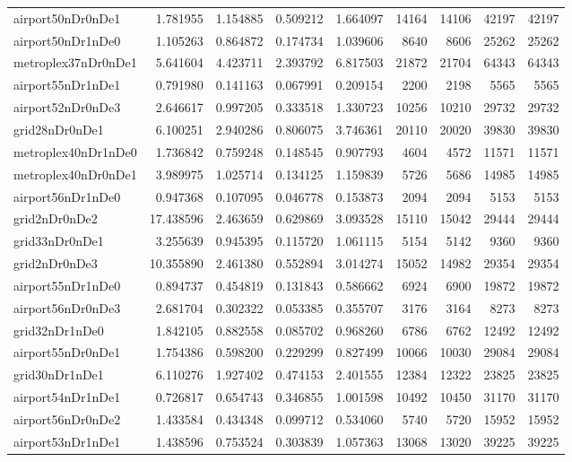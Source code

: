 \begin{longtable}{|l|r|r|r|r|r|r|r|r|}
airport50nDr0nDe1 & 1.781955 & 1.154885 & 0.509212 & 1.664097 & 14164 & 14106 & 42197 & 42197 \\
airport50nDr1nDe0 & 1.105263 & 0.864872 & 0.174734 & 1.039606 & 8640 & 8606 & 25262 & 25262 \\
metroplex37nDr0nDe1 & 5.641604 & 4.423711 & 2.393792 & 6.817503 & 21872 & 21704 & 64343 & 64343 \\
airport55nDr1nDe1 & 0.791980 & 0.141163 & 0.067991 & 0.209154 & 2200 & 2198 & 5565 & 5565 \\
airport52nDr0nDe3 & 2.646617 & 0.997205 & 0.333518 & 1.330723 & 10256 & 10210 & 29732 & 29732 \\
grid28nDr0nDe1 & 6.100251 & 2.940286 & 0.806075 & 3.746361 & 20110 & 20020 & 39830 & 39830 \\
metroplex40nDr1nDe0 & 1.736842 & 0.759248 & 0.148545 & 0.907793 & 4604 & 4572 & 11571 & 11571 \\
metroplex40nDr0nDe1 & 3.989975 & 1.025714 & 0.134125 & 1.159839 & 5726 & 5686 & 14985 & 14985 \\
airport56nDr1nDe0 & 0.947368 & 0.107095 & 0.046778 & 0.153873 & 2094 & 2094 & 5153 & 5153 \\
grid2nDr0nDe2 & 17.438596 & 2.463659 & 0.629869 & 3.093528 & 15110 & 15042 & 29444 & 29444 \\
grid33nDr0nDe1 & 3.255639 & 0.945395 & 0.115720 & 1.061115 & 5154 & 5142 & 9360 & 9360 \\
grid2nDr0nDe3 & 10.355890 & 2.461380 & 0.552894 & 3.014274 & 15052 & 14982 & 29354 & 29354 \\
airport55nDr1nDe0 & 0.894737 & 0.454819 & 0.131843 & 0.586662 & 6924 & 6900 & 19872 & 19872 \\
airport56nDr0nDe3 & 2.681704 & 0.302322 & 0.053385 & 0.355707 & 3176 & 3164 & 8273 & 8273 \\
grid32nDr1nDe0 & 1.842105 & 0.882558 & 0.085702 & 0.968260 & 6786 & 6762 & 12492 & 12492 \\
airport55nDr0nDe1 & 1.754386 & 0.598200 & 0.229299 & 0.827499 & 10066 & 10030 & 29084 & 29084 \\
grid30nDr1nDe1 & 6.110276 & 1.927402 & 0.474153 & 2.401555 & 12384 & 12322 & 23825 & 23825 \\
airport54nDr1nDe1 & 0.726817 & 0.654743 & 0.346855 & 1.001598 & 10492 & 10450 & 31170 & 31170 \\
airport56nDr0nDe2 & 1.433584 & 0.434348 & 0.099712 & 0.534060 & 5740 & 5720 & 15952 & 15952 \\
airport53nDr1nDe1 & 1.438596 & 0.753524 & 0.303839 & 1.057363 & 13068 & 13020 & 39225 & 39225 \\

\end{longtable}
